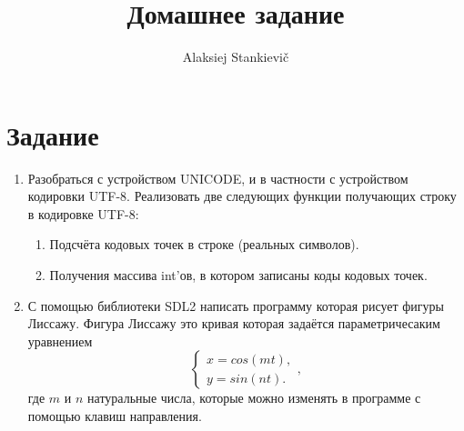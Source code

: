 \documentclass[12pt]{article}
\author{Alaksiej Stankievič}
\title{Домашнее задание}
\begin{document}

\section{Задание}


\begin{enumerate}
 \item Разобраться с устройством UNICODE,  и в частности с устройством 
кодировки UTF-8. Реализовать две следующих функции получающих строку в 
кодировке UTF-8:
\begin{enumerate}
 \item Подсчёта кодовых точек в строке (реальных символов). 
 \item Получения массива int'ов, в котором записаны коды кодовых точек.
\end{enumerate}

 \item С помощью библиотеки SDL2 написать программу которая рисует фигуры 
Лиссажу. Фигура Лиссажу это кривая которая задаётся параметричесаким уравнением 
\begin{equation}
 \left\{
 \begin{array}{l}x=cos(mt),\\y=sin(nt). \end{array}                        
               \right. ,
\end{equation}
где $m$ и $n$ натуральные числа, которые можно изменять в программе с помощью 
клавиш направления.

\end{enumerate}
\end{document}
